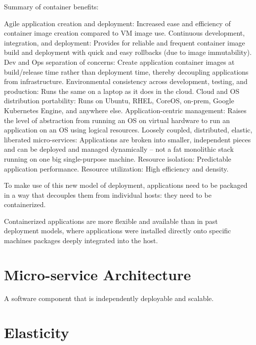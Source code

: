 Summary of container benefits:

Agile application creation and deployment: Increased ease and efficiency of container image creation compared to VM image use.
Continuous development, integration, and deployment: Provides for reliable and frequent container image build and deployment with quick and easy rollbacks (due to image immutability).
Dev and Ops separation of concerns: Create application container images at build/release time rather than deployment time, thereby decoupling applications from infrastructure.
Environmental consistency across development, testing, and production: Runs the same on a laptop as it does in the cloud.
Cloud and OS distribution portability: Runs on Ubuntu, RHEL, CoreOS, on-prem, Google Kubernetes Engine, and anywhere else.
Application-centric management: Raises the level of abstraction from running an OS on virtual hardware to run an application on an OS using logical resources.
Loosely coupled, distributed, elastic, liberated micro-services: Applications are broken into smaller, independent pieces and can be deployed and managed dynamically – not a fat monolithic stack running on one big single-purpose machine.
Resource isolation: Predictable application performance.
Resource utilization: High efficiency and density.

To make use of this new model of deployment, applications need to be packaged in a way that decouples them from individual hosts: they need to be containerized.

Containerized applications are more flexible and available than in past deployment models, where applications were installed directly onto specific machines packages deeply integrated into the host.


\section{Micro-service Architecture}
\label{sec:containers-orchestration-micro-service-architecture}

A software component that is independently deployable and scalable.



\section{Elasticity}
\label{sec:containers-orchestration-elasticity}

\lipsum[1]